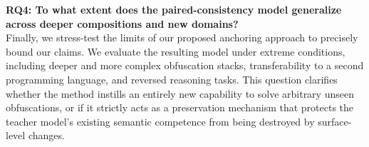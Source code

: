\vspace{0.5em}
\noindent
\textbf{RQ4: To what extent does the paired-consistency model generalize across deeper compositions and new domains?} \\
Finally, we stress-test the limits of our proposed anchoring approach to precisely bound our claims. We evaluate the resulting model under extreme conditions, including deeper and more complex obfuscation stacks, transferability to a second programming language, and reversed reasoning tasks. This question clarifies whether the method instills an entirely new capability to solve arbitrary unseen obfuscations, or if it strictly acts as a preservation mechanism that protects the teacher model's existing semantic competence from being destroyed by surface-level changes.
